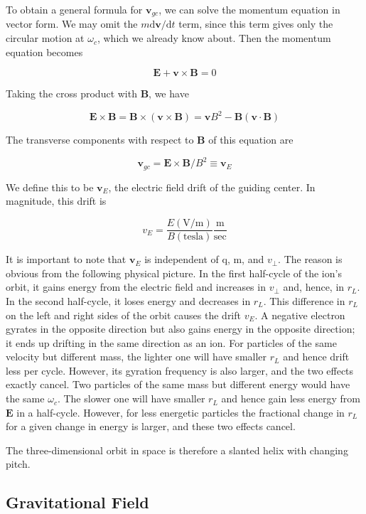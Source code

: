 \documentclass[
  notoc %
]{tufte-book}
\begin{document}
To obtain a general formula for \(\mathbf{v}_{gc}\), we can solve the
momentum equation in vector form. We may omit the
\(m \mathrm{d}\mathbf{v}/\mathrm{d}t\) term, since this term gives only
the circular motion at \(\omega_c\), which we already know about. Then
the momentum equation becomes

\[
\mathbf{E} + \mathbf{v}\times\mathbf{B} = 0
\]

Taking the cross product with \(\mathbf{B}\), we have

\[
\mathbf{E}\times\mathbf{B} = \mathbf{B}\times(\mathbf{v}\times\mathbf{B}) = \mathbf{v}B^2 - \mathbf{B}(\mathbf{v}\cdot\mathbf{B})
\]

The transverse components with respect to \(\mathbf{B}\) of this
equation are

\[
\mathbf{v}_{gc} = \mathbf{E}\times\mathbf{B}/B^2 \equiv \mathbf{v}_E
\]

We define this to be \(\mathbf{v}_E\), the electric field drift of the
guiding center. In magnitude, this drift is

\[
v_E = \frac{E(\text{V/m})}{B(\text{tesla})}\frac{\text{m}}{\text{sec}}
\]

It is important to note that \(\mathbf{v}_E\) is independent of q, m,
and \(v_\perp\). The reason is obvious from the following physical
picture. In the first half-cycle of the ion's orbit, it gains energy
from the electric field and increases in \(v_\perp\) and, hence, in
\(r_L\). In the second half-cycle, it loses energy and decreases in
\(r_L\). This difference in \(r_L\) on the left and right sides of the
orbit causes the drift \(v_E\). A negative electron gyrates in the
opposite direction but also gains energy in the opposite direction; it
ends up drifting in the same direction as an ion. For particles of the
same velocity but different mass, the lighter one will have smaller
\(r_L\) and hence drift less per cycle. However, its gyration frequency
is also larger, and the two effects exactly cancel. Two particles of the
same mass but different energy would have the same \(\omega_c\). The
slower one will have smaller \(r_L\) and hence gain less energy from
\(\mathbf{E}\) in a half-cycle. However, for less energetic particles
the fractional change in \(r_L\) for a given change in energy is larger,
and these two effects cancel.

The three-dimensional orbit in space is therefore a slanted helix with
changing pitch.

\hypertarget{sec:gravity_field}{%
\subsection{Gravitational Field}\label{sec:gravity_field}}
\end{document}
